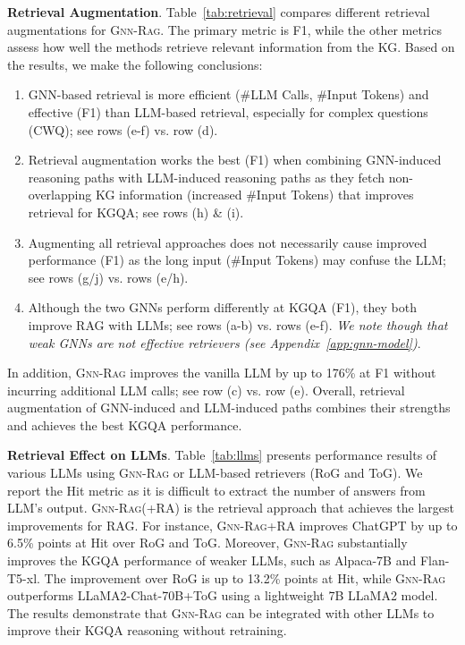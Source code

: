 \documentclass{article}
\newcommand{\grag}{\textsc{Gnn-Rag}\xspace}
\newcommand{\gragx}{\textsc{Gnn-Rag}}
\theoremstyle{plain}
\theoremstyle{definition}
\theoremstyle{remark}
\begin{document}
\textbf{Retrieval Augmentation}. Table~\ref{tab:retrieval} compares different retrieval augmentations for \grag. The primary metric is F1, while the other metrics assess how well the methods retrieve relevant information from the KG. Based on the results, we make the following conclusions: 
\begin{enumerate}
    \item  GNN-based retrieval is more efficient (\#LLM Calls, \#Input Tokens) and effective (F1) than LLM-based retrieval, especially for complex questions (CWQ); see rows (e-f)  vs. row (d). 
    \item Retrieval augmentation works the best (F1) when combining GNN-induced reasoning paths with LLM-induced reasoning paths as they fetch non-overlapping KG information (increased \#Input Tokens) that improves retrieval for KGQA; see rows (h) \& (i).
    \item Augmenting all retrieval approaches does not necessarily cause improved performance (F1) as the long input (\#Input Tokens) may confuse the LLM; see rows (g/j) vs. rows (e/h).
    \item Although the two GNNs perform differently at KGQA (F1), they both improve RAG with LLMs; see rows (a-b) vs. rows (e-f). \textit{We note though that weak GNNs are not effective retrievers (see Appendix~\ref{app:gnn-model})}.
\end{enumerate}


In addition, \grag improves the vanilla LLM by up to 176\% at F1 without incurring additional LLM calls; see row (c) vs. row (e). Overall,  retrieval augmentation of GNN-induced and LLM-induced paths combines their strengths and achieves the best KGQA performance. 









\textbf{Retrieval Effect on LLMs}. 
Table~\ref{tab:llms} presents performance results of various LLMs using \grag or LLM-based retrievers (RoG and ToG). We report the Hit metric as it is difficult to extract the number of answers from LLM’s output. \grag (+RA) is the retrieval approach that achieves the  largest improvements for RAG. For instance, \gragx+RA improves ChatGPT by up to 6.5\% points at Hit over RoG and ToG. Moreover, \grag substantially improves the KGQA performance of weaker LLMs, such as Alpaca-7B and Flan-T5-xl. The improvement over RoG is up to 13.2\% points at Hit, while \grag outperforms LLaMA2-Chat-70B+ToG using a lightweight 7B LLaMA2 model. The results demonstrate that \grag can be integrated with other LLMs to improve their KGQA reasoning without retraining.
\end{document}
